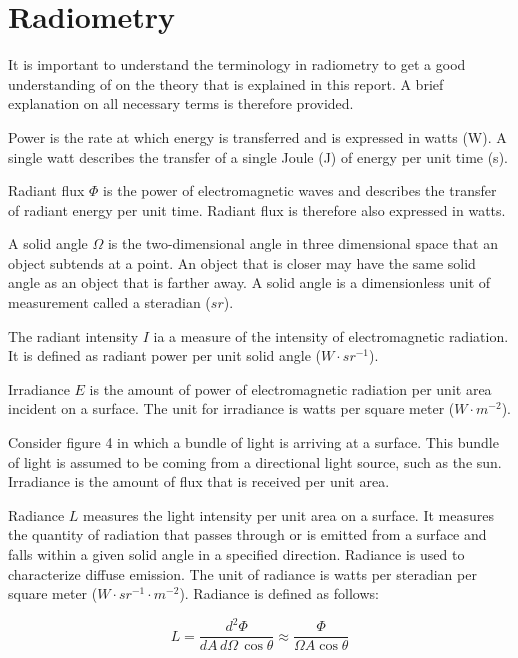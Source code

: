 \documentclass[11pt,a4paper]{report}
\begin{document}
\section{Radiometry}

It is important to understand the terminology in radiometry to get a good understanding of on the theory that is explained in this report. A brief explanation on all necessary terms is therefore provided.

Power is the rate at which energy is transferred and is expressed in watts (W). A single watt describes the transfer of a single Joule (J) of energy per unit time (s). 

Radiant flux $\Phi$ is the power of electromagnetic waves and describes the transfer of radiant energy per unit time. Radiant flux is therefore also expressed in watts.

A solid angle $\Omega$ is the two-dimensional angle in three dimensional space that an object subtends at a point. An object that is closer may have the same solid angle as an object that is farther away. A solid angle is a dimensionless unit of measurement called a steradian ($sr$).

The radiant intensity $I$ ia a measure of the intensity of electromagnetic radiation. It is defined as radiant power per unit solid angle ($W \cdot sr^{-1}$).

Irradiance $E$ is the amount of power of electromagnetic radiation per unit area incident on a surface. The unit for irradiance is watts per square meter ($W \cdot m^{-2}$).

Consider figure 4 in which a bundle of light is arriving at a surface. This bundle of light is assumed to be coming from a directional light source, such as the sun. Irradiance is the amount of flux that is received per unit area.

Radiance $L$ measures the light intensity per unit area on a surface. It measures the quantity of radiation that passes through or is emitted from a surface and falls within a given solid angle in a specified direction. Radiance is used to characterize diffuse emission. The unit of radiance is watts per steradian per square meter ($W \cdot {sr}^{-1} \cdot m^{-2}$). Radiance is defined as follows:

\begin{equation}
L = \frac{d^2 \Phi}{dA\, d\Omega\, \cos \theta} \approx \frac{\Phi}{\Omega A \cos \theta}
\end{equation}
\end{document}

